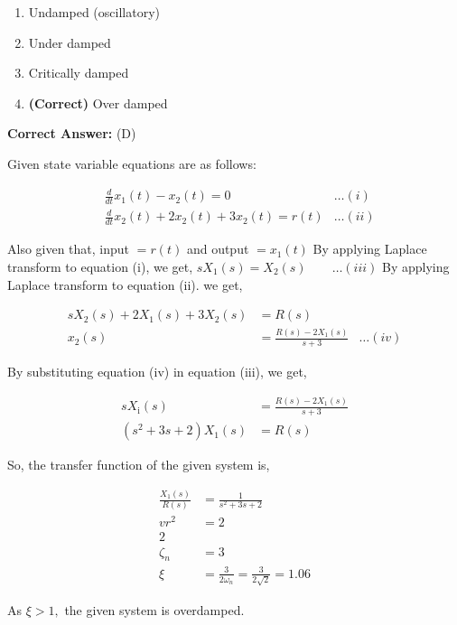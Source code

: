 \documentclass[11pt,a4paper]{article}
\begin{document}
\begin{enumerate}[label=(\Alph*)]
    \item Undamped (oscillatory)
    \item Under damped
    \item Critically damped
    \item \textbf{(Correct)} Over damped
\end{enumerate}

\noindent \textbf{Correct Answer:} (D)

\begin{tcolorbox}[solbox, title=Detailed Solution -- Question 44]
Given state variable equations are as follows:

\[
\begin{aligned} &\frac{d}{d t} x_{1}(t)-x_{2}(t)=0 &\ldots(i)\\ &\frac{d}{d t} x_{2}(t)+2 x_{2}(t)+3 x_{2}(t)=r(t) &\ldots(ii) \end{aligned}
\]

 Also given that, input $=r(t)$ and output $=x_{1}(t)$
 By applying Laplace transform to equation (i), we
 get,
$s X_{1}(s)=X_{2}(s) \qquad \ldots(iii)$
 By applying Laplace transform to equation (ii).
 we get,

\[
\begin{aligned} s X_{2}(s)+2 X_{1}(s)+3 X_{2}(s)&=R(s) \\ x_{2}(s)&=\frac{R(s)-2 X_{1}(s)}{s+3} &\ldots(iv) \end{aligned}
\]

 By substituting equation (iv) in equation (iii), we get,

\[
\begin{aligned} s X_{\mathrm{i}}(s)&=\frac{R(s)-2 X_{1}(s)}{s+3}\\ \left(s^{2}+3 s+2\right) X_{1}(s)&=R(s) \end{aligned}
\]

So, the transfer function of the given system is,

\[
\begin{aligned}
\frac{X_{1}(s)}{R(s)} &=\frac{1}{s^{2}+3 s+2} \\
v r^{2} &=2 \\
2 \\\zeta_{n} &=3 \\
\xi &=\frac{3}{2 \omega_{n}}=\frac{3}{2 \sqrt{2}}=1.06
\end{aligned}
\]

As  $\xi > 1,$  the given system is overdamped.
\end{tcolorbox}
\end{document}
